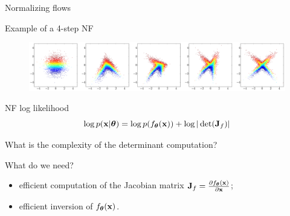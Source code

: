 \begin{frame}{Normalizing flows}
	\begin{block}{Example of a 4-step NF}
		\vspace{-0.2cm}
		\begin{figure}
			\includegraphics[width=\linewidth]{figs/flow_4_steps_example.png}
		\end{figure}
	\end{block}
	\vspace{-0.5cm}
	\begin{block}{NF log likelihood}
		\vspace{-0.3cm}
		\[
		\log p(\mathbf{x}|\boldsymbol{\theta}) = \log p(f_{\boldsymbol{\theta}}(\mathbf{x})) + \log |\det ( \mathbf{J}_f)|
		\]
		\vspace{-0.3cm}
	\end{block}
	What is the complexity of the determinant computation?
	\begin{block}{What do we need?}
		\begin{itemize}
			\item efficient computation of the Jacobian matrix $\mathbf{J}_f = \frac{\partial f_{\boldsymbol{\theta}}(\mathbf{x})}{\partial \mathbf{x}}$;
			\item efficient inversion of $f_{\boldsymbol{\theta}}(\mathbf{x})$.
		\end{itemize}
	\end{block}
\end{frame}
